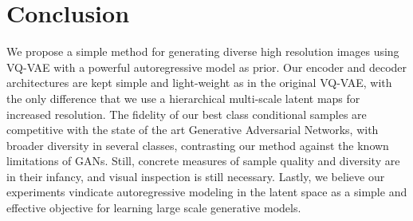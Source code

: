 \section{Conclusion} \label{sec:conc}
We propose a simple method for generating diverse high resolution images using VQ-VAE with a powerful autoregressive model as prior. Our encoder and decoder architectures are kept simple and light-weight as in the original VQ-VAE, with the only difference that we use a hierarchical multi-scale latent maps for increased resolution. The fidelity of our best class conditional samples are competitive with the state of the art Generative Adversarial Networks, with broader diversity in several classes, contrasting our method against the known limitations of GANs. Still, concrete measures of sample quality and diversity are in their infancy, and visual inspection is still necessary. Lastly, we believe our experiments vindicate autoregressive modeling in the latent space as a simple and effective objective for learning large scale generative models.
